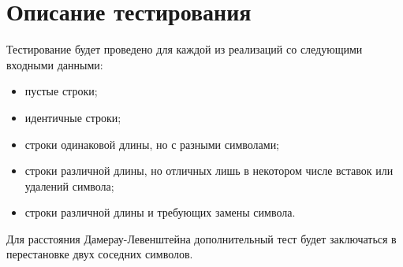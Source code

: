 \section{Описание тестирования}

Тестирование будет проведено для каждой из реализаций со следующими входными данными:
\begin{itemize}
	\item пустые строки;
	\item идентичные строки;
	\item строки одинаковой длины, но с разными символами;
	\item строки различной длины, но отличных лишь в некотором числе вставок или удалений символа;
	\item строки различной длины и требующих замены символа.
\end{itemize}

Для расстояния Дамерау-Левенштейна дополнительный тест будет заключаться в перестановке двух соседних символов.
